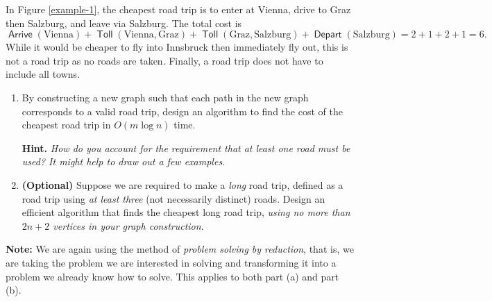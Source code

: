 \documentclass[12pt]{article}
\DeclareMathOperator{\arr}{\mathsf{Arrive}}
\DeclareMathOperator{\dep}{\mathsf{Depart}}
\DeclareMathOperator{\toll}{\mathsf{Toll}}
\begin{document}
\begin{question}
In Figure \ref{example-1}, the cheapest road trip is to enter at Vienna, drive to Graz then Salzburg, and leave via Salzburg. The total cost is $$\arr(\text{Vienna}) + \toll(\text{Vienna}, \text{Graz}) + \toll(\text{Graz}, \text{Salzburg}) + \dep(\text{Salzburg}) = 2 + 1 + 2 + 1 = 6.$$ While it would be cheaper to fly into Innsbruck then immediately fly out, this is not a road trip as no roads are taken. Finally, a road trip does not have to include all towns.

\newpage

\begin{enumerate}[label = (\alph*)]
    \item By constructing a new graph such that each path in the new graph corresponds to a valid road trip, design an algorithm to find the cost of the cheapest road trip in $O(m\log n)$ time.
    
    {\bfseries Hint.} {\em How do you account for the requirement that at least one road must be used? It might help to draw out a few examples.}
    
    \item \textbf{(Optional)} Suppose we are required to make a \emph{long} road trip, defined as a road trip using \emph{at least three} (not necessarily distinct) roads. Design an efficient algorithm that finds the cheapest long road trip, \emph{using no more than $2n+2$ vertices in your graph construction}.
  
\end{enumerate}
{\bfseries Note:} We are again using the method of \textit{problem solving by reduction}, that is, we are taking the problem we are interested in solving and transforming it into a problem we already know how to solve. This applies to both part (a) and part (b).


\end{question}

\begin{rubric}



\end{rubric}

\newpage

\begin{solution}
\end{solution}
\begin{attribution}
\end{attribution}
\end{document}
